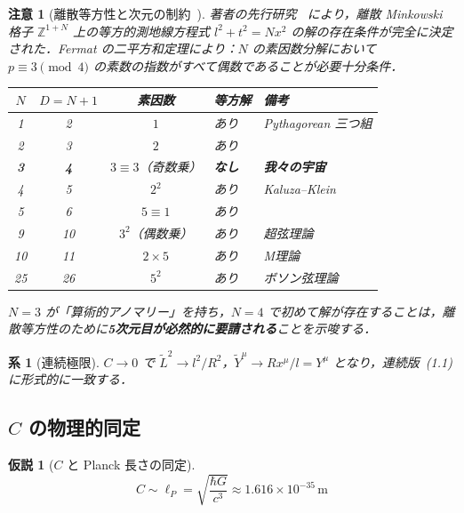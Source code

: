 \documentclass[12pt,a4paper]{ltjsarticle}
\newtheorem{corollary}[theorem]{系}
\newtheorem*{remark}{注意}
\newtheorem*{hypothesis}{仮説}
\begin{document}
\begin{remark}[離散等方性と次元の制約~{\normalfont\cite{Kihara2026b}}]\label{rem:fermat}
著者の先行研究~\cite{Kihara2026b} により，離散 Minkowski 格子 $\mathbb{Z}^{1+N}$ 上の等方的測地線方程式 $l^2 + t^2 = Nx^2$ の解の存在条件が完全に決定された．Fermat の二平方和定理により：$N$ の素因数分解において $p \equiv 3 \pmod{4}$ の素数の指数がすべて偶数であることが必要十分条件．

\begin{center}
\begin{tabular}{cccll}
\toprule
$N$ & $D=N\!+\!1$ & 素因数 & 等方解 & 備考 \\
\midrule
1 & 2 & $1$ & あり & Pythagorean 三つ組 \\
2 & 3 & $2$ & あり & \\
\textbf{3} & \textbf{4} & $3 \equiv 3$（奇数乗） & \textbf{なし} & \textbf{我々の宇宙} \\
4 & 5 & $2^2$ & あり & Kaluza--Klein \\
5 & 6 & $5 \equiv 1$ & あり & \\
9 & 10 & $3^2$（偶数乗） & あり & 超弦理論 \\
10 & 11 & $2 \times 5$ & あり & M理論 \\
25 & 26 & $5^2$ & あり & ボソン弦理論 \\
\bottomrule
\end{tabular}
\end{center}

$N = 3$ が「算術的アノマリー」を持ち，$N = 4$ で初めて解が存在することは，離散等方性のために\textbf{5次元目が必然的に要請される}ことを示唆する．
\end{remark}

\begin{corollary}[連続極限]
$C \to 0$ で $\tilde{L}^2 \to l^2/R^2$，$\tilde{Y}^\mu \to Rx^\mu/l = Y^\mu$ となり，連続版~(1.1) に形式的に一致する．
\end{corollary}

\subsection{$C$ の物理的同定}

\begin{hypothesis}[$C$ と Planck 長さの同定]\label{hyp:planck}
\begin{equation}
C \sim \ell_P = \sqrt{\frac{\hbar G}{c^3}} \approx 1.616 \times 10^{-35}\,\text{m} \tag{6.5}
\end{equation}
\end{hypothesis}
\end{document}
